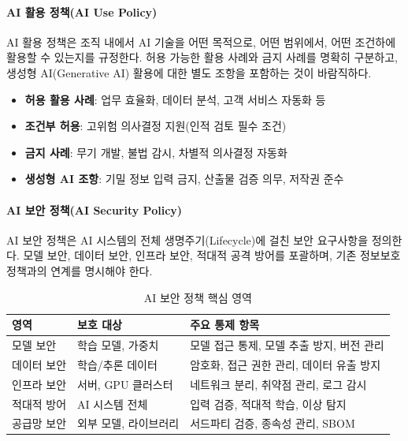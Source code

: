\paragraph{AI 활용 정책(AI Use Policy)}
AI 활용 정책은 조직 내에서 AI 기술을 어떤 목적으로, 어떤 범위에서, 어떤 조건하에 활용할 수 있는지를 규정한다. 허용 가능한 활용 사례와 금지 사례를 명확히 구분하고, 생성형 AI(Generative AI) 활용에 대한 별도 조항\cite{bender2021stochastic}을 포함하는 것이 바람직하다.

\begin{itemize}
 \item \textbf{허용 활용 사례}: 업무 효율화, 데이터 분석, 고객 서비스 자동화 등
 \item \textbf{조건부 허용}: 고위험 의사결정 지원(인적 검토 필수 조건)
 \item \textbf{금지 사례}: 무기 개발, 불법 감시, 차별적 의사결정 자동화
 \item \textbf{생성형 AI 조항}: 기밀 정보 입력 금지, 산출물 검증 의무, 저작권 준수
\end{itemize}

\paragraph{AI 보안 정책(AI Security Policy)}
AI 보안 정책은 AI 시스템의 전체 생명주기(Lifecycle)에 걸친 보안 요구사항을 정의한다. 모델 보안, 데이터 보안, 인프라 보안, 적대적 공격 방어를 포괄하며, 기존 정보보호 정책과의 연계를 명시\cite{biggio2018wild}해야 한다.

\begin{table}[htbp]
\centering
\caption{AI 보안 정책 핵심 영역}
\label{tab:security_policy_areas}
\begin{tabularx}{\textwidth}{p{2.5cm}p{3cm}X}
\toprule
\textbf{영역} & \textbf{보호 대상} & \textbf{주요 통제 항목} \\
\midrule
모델 보안 & 학습 모델, 가중치 & 모델 접근 통제, 모델 추출 방지, 버전 관리 \\
데이터 보안 & 학습/추론 데이터 & 암호화, 접근 권한 관리, 데이터 유출 방지 \\
인프라 보안 & 서버, GPU 클러스터 & 네트워크 분리, 취약점 관리, 로그 감시 \\
적대적 방어 & AI 시스템 전체 & 입력 검증, 적대적 학습, 이상 탐지 \\
공급망 보안 & 외부 모델, 라이브러리 & 서드파티 검증, 종속성 관리, SBOM \\
\bottomrule
\end{tabularx}
\end{table}

